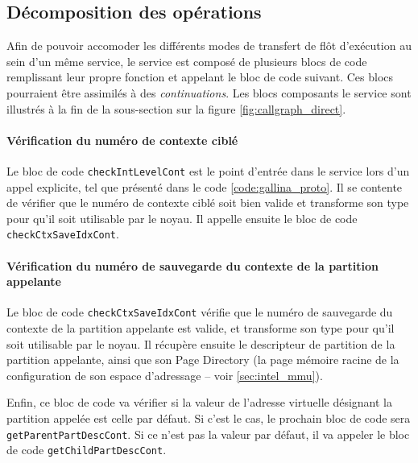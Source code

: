 		\subsection{Décomposition des opérations}

		Afin de pouvoir accomoder les différents modes de transfert de flôt d'exécution au sein d'un même service, le service est composé de plusieurs blocs de code remplissant leur propre fonction et appelant le bloc de code suivant. Ces blocs pourraient être assimilés à des \emph{continuations}. Les blocs composants le service sont illustrés à la fin de la sous-section sur la figure \ref{fig:callgraph_direct}.

		\paragraph{Vérification du numéro de contexte ciblé}

		Le bloc de code \texttt{checkIntLevelCont} est le point d'entrée dans le service lors d'un appel explicite, tel que présenté dans le code \ref{code:gallina_proto}.
		Il se contente de vérifier que le numéro de contexte ciblé soit bien valide et transforme son type pour qu'il soit utilisable par le noyau. Il appelle ensuite le bloc de code \texttt{checkCtxSaveIdxCont}.


		\paragraph{Vérification du numéro de sauvegarde du contexte de la partition appelante}
		
		Le bloc de code \texttt{checkCtxSaveIdxCont} vérifie que le numéro de sauvegarde du contexte de la partition appelante est valide, et transforme son type pour qu'il soit utilisable par le noyau. Il récupère ensuite le descripteur de partition de la partition appelante, ainsi que son Page Directory (la page mémoire racine de la configuration de son espace d'adressage -- voir \ref{sec:intel_mmu}).

		Enfin, ce bloc de code va vérifier si la valeur de l'adresse virtuelle désignant la partition appelée est celle par défaut. Si c'est le cas, le prochain bloc de code sera \texttt{getParentPartDescCont}. Si ce n'est pas la valeur par défaut, il va appeler le bloc de code \texttt{getChildPartDescCont}.

